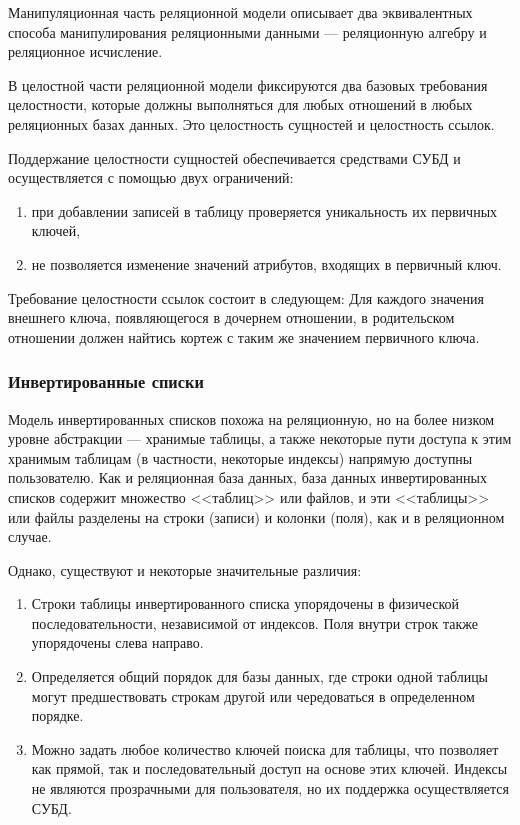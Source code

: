Манипуляционная часть реляционной модели описывает два эквивалентных способа манипулирования реляционными данными --- реляционную алгебру и реляционное исчисление.~\cite{lecnotes}

В целостной части реляционной модели фиксируются два базовых требования целостности, которые должны выполняться для любых отношений в любых реляционных базах данных.
Это целостность сущностей и целостность ссылок.~\cite{lecnotes}

Поддержание целостности сущностей обеспечивается средствами СУБД и осуществляется с помощью двух ограничений:
\begin{enumerate}
    \item при добавлении записей в таблицу проверяется уникальность их первичных ключей,
    \item не позволяется изменение значений атрибутов, входящих в первичный ключ.~\cite{lecnotes}
\end{enumerate}

Требование целостности ссылок состоит в следующем:
Для каждого значения внешнего ключа, появляющегося в дочернем отношении, в родительском отношении должен найтись кортеж с таким же значением первичного ключа.~\cite{lecnotes}

\subsubsection{Инвертированные списки}

Модель инвертированных списков похожа на реляционную, но на более низком уровне абстракции --- хранимые таблицы, а также некоторые пути доступа к этим хранимым таблицам (в частности, некоторые индексы) напрямую доступны пользователю.
Как и реляционная база данных, база данных инвертированных списков содержит множество <<таблиц>> или файлов, и эти <<таблицы>> или файлы разделены на строки (записи) и колонки (поля), как и в реляционном случае.~\cite{date-wr}

Однако, существуют и некоторые значительные различия:
\begin{enumerate}
    \item Строки таблицы инвертированного списка упорядочены в физической последовательности, независимой от индексов.
        Поля внутри строк также упорядочены слева направо.
    \item Определяется общий порядок для базы данных, где строки одной таблицы могут предшествовать строкам другой или чередоваться в определенном порядке.
    \item Можно задать любое количество ключей поиска для таблицы, что позволяет как прямой, так и последовательный доступ на основе этих ключей.
        Индексы не являются прозрачными для пользователя, но их поддержка осуществляется СУБД.
\end{enumerate}

